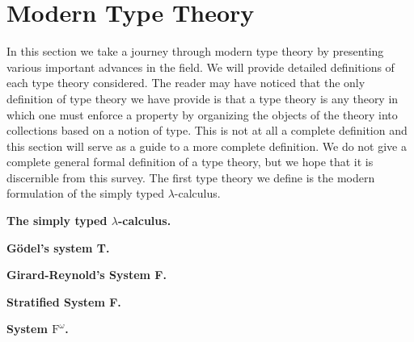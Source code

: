 \section{Modern Type Theory}
\label{sec:moderen_type_theory}
In this section we take a journey through modern type theory by
presenting various important advances in the field.  We will provide
detailed definitions of each type theory considered.  The reader may
have noticed that the only definition of type theory we have provide
is that a type theory is any theory in which one must enforce a
property by organizing the objects of the theory into collections
based on a notion of type.  This is not at all a complete definition
and this section will serve as a guide to a more complete definition.
We do not give a complete general formal definition of a type theory,
but we hope that it is discernible from this survey.  The first type
theory we define is the modern formulation of the simply typed
$\lambda$-calculus.

\textbf{The simply typed $\lambda$-calculus.} 


\textbf{G\"odel's system T.} 

\textbf{Girard-Reynold's System F.} 

\textbf{Stratified System F.} 

\textbf{System $\text{F}^\omega$.}   

